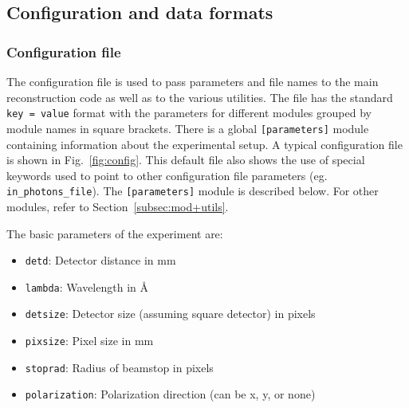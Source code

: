 \documentclass[]{iucr}              %
\begin{document}
\subsection{Configuration and data formats}
\label{subsec:formats}
\subsubsection{Configuration file}
\label{subsec:config}
The configuration file is used to pass parameters and file names to the main reconstruction code as well as to the various utilities. The file has the standard \texttt{key = value} format with the parameters for different modules grouped by module names in square brackets. There is a global \texttt{[parameters]} module containing information about the experimental setup. A typical configuration file is shown in Fig.~\ref{fig:config}. This default file also shows the use of special keywords used to point to other configuration file parameters (eg. \texttt{in\_photons\_file}). The \texttt{[parameters]} module is described below. For other modules, refer to Section~\ref{subsec:mod+utils}.

The basic parameters of the experiment are:
\begin{itemize}
\item \texttt{detd}: Detector distance in mm
\item \texttt{lambda}: Wavelength in \AA
\item \texttt{detsize}: Detector size (assuming square detector) in pixels
\item \texttt{pixsize}: Pixel size in mm
\item \texttt{stoprad}: Radius of beamstop in pixels
\item \texttt{polarization}: Polarization direction (can be x, y, or none)
\end{itemize}
\end{document}
